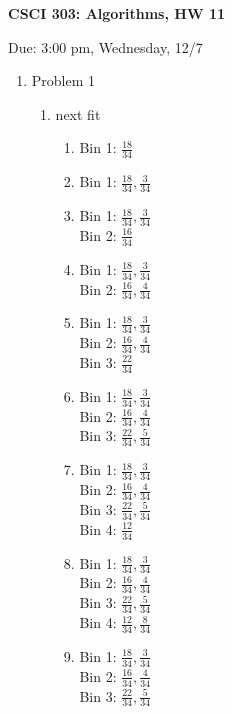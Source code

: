 \documentclass[11pt]{article}
\begin{document}
\begin{LARGE}
\centerline {\bf CSCI 303: Algorithms, HW 11}
\end{LARGE}
\vskip 0.25cm
\centerline{Due: 3:00 pm, Wednesday, 12/7}

\begin{enumerate}
\item Problem 1\\
\begin{enumerate}
\item next fit
\begin{enumerate}
\item Bin 1: $\frac{18}{34}$\\
\item Bin 1: $\frac{18}{34}, \frac{3}{34}$\\
\item Bin 1: $\frac{18}{34}, \frac{3}{34}$\\
Bin 2: $\frac{16}{34}$\\
\item Bin 1: $\frac{18}{34}, \frac{3}{34}$\\
Bin 2: $\frac{16}{34}, \frac{4}{34}$\\
\item Bin 1: $\frac{18}{34}, \frac{3}{34}$\\
Bin 2: $\frac{16}{34}, \frac{4}{34}$\\
Bin 3: $\frac{22}{34}$
\item Bin 1: $\frac{18}{34}, \frac{3}{34}$\\
Bin 2: $\frac{16}{34}, \frac{4}{34}$\\
Bin 3: $\frac{22}{34}, \frac{5}{34}$
\item Bin 1: $\frac{18}{34}, \frac{3}{34}$\\
Bin 2: $\frac{16}{34}, \frac{4}{34}$\\
Bin 3: $\frac{22}{34}, \frac{5}{34}$\\
Bin 4: $\frac{12}{34}$
\item Bin 1: $\frac{18}{34}, \frac{3}{34}$\\
Bin 2: $\frac{16}{34}, \frac{4}{34}$\\
Bin 3: $\frac{22}{34}, \frac{5}{34}$\\
Bin 4: $\frac{12}{34}, \frac{8}{34}$
\item Bin 1: $\frac{18}{34}, \frac{3}{34}$\\
Bin 2: $\frac{16}{34}, \frac{4}{34}$\\
Bin 3: $\frac{22}{34}, \frac{5}{34}$\\

\end{enumerate}
\end{enumerate}
\end{enumerate}
\end{document}
